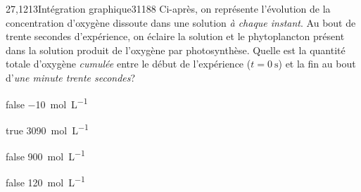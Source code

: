         \begin{question}{27,1213}{Intégration graphique}{3}{1188}
             Ci-après, on représente l'évolution de la concentration d'oxygène dissoute dans une solution \emph{à chaque instant}. Au bout de trente secondes d'expérience, on éclaire la solution et le phytoplancton présent dans la solution produit de l'oxygène par photosynthèse. Quelle est la quantité totale d'oxygène \emph{cumulée} entre le début de l'expérience ($t=\SI{0}{\second}$) et la fin au bout d'\emph{une minute trente secondes}?
            \begin{figure}
             \end{figure}
        \end{question}
        \begin{reponses}
            \item[false] \SI{-10}{\mol\per\liter}
		    \item[true] \SI{3090}{\mol\per\liter}
		    \item[false] \SI{900}{\mol\per\liter}
		    \item[false] \SI{120}{\mol\per\liter}
		\end{reponses}
